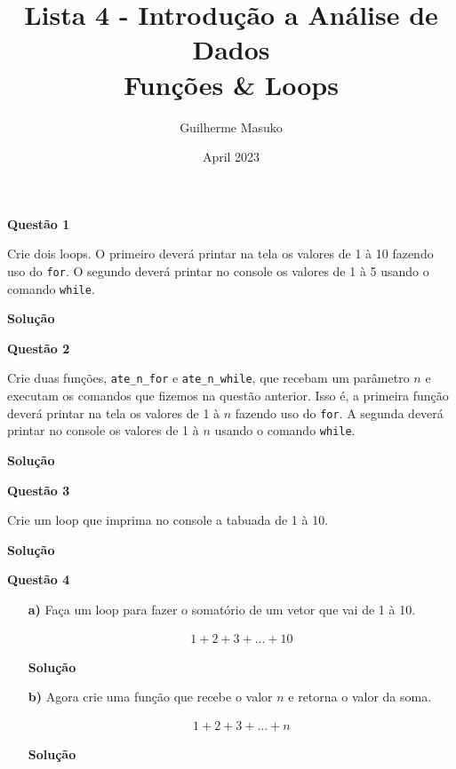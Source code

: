 \documentclass[12pt, a4paper]{article}
\title{Lista 4 - Introdução a Análise de Dados \\
	Funções \& Loops}
\author{Guilherme Masuko}
\date{April 2023}
\begin{document}
	
\clearpage
\maketitle
\thispagestyle{empty}

\textbf{Questão 1}

Crie dois loops. O primeiro deverá printar na tela os valores de 1 à 10 fazendo uso do \texttt{for}. O segundo deverá printar no console os valores de 1 à 5 usando o comando \texttt{while}.



\textbf{Solução}





\textbf{Questão 2}

Crie duas funções, \texttt{ate\_n\_for} e \texttt{ate\_n\_while}, que recebam um parâmetro $n$ e executam os comandos que fizemos na questão anterior. Isso é, a primeira função deverá printar na tela os valores de 1 à $n$ fazendo uso do \texttt{for}. A segunda deverá printar no console os valores de 1 à $n$ usando o comando \texttt{while}.



\textbf{Solução}





\textbf{Questão 3}

Crie um loop que imprima no console a tabuada de 1 à 10.



\textbf{Solução}





\textbf{Questão 4}

\begin{itemize}
	\item[\textbf{a)}] Faça um loop para fazer o somatório de um vetor que vai de 1 à 10.
	
		\begin{align*}
			1+ 2+ 3 + ... + 10
		\end{align*}
	
	
	
	\textbf{Solução}
	
	
	
	
	
	\item[\textbf{b)}] Agora crie uma função que recebe o valor $n$ e retorna o valor da soma.
	
		\begin{align*}
			1+ 2+ 3 + ... + n
		\end{align*}
	
	
	\textbf{Solução}
	
	
	
	
		
\end{itemize}
\end{document}
